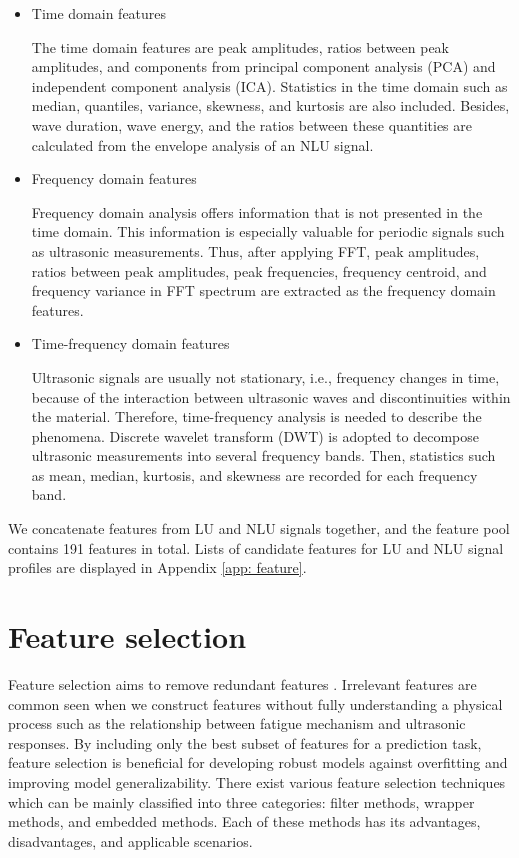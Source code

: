 \begin{itemize}
    \item Time domain features
    
    The time domain features are peak amplitudes, ratios between peak amplitudes, and components from principal component analysis (PCA) and independent component analysis (ICA). Statistics in the time domain such as median, quantiles, variance, skewness, and kurtosis are also included. Besides, wave duration, wave energy, and the ratios between these quantities are calculated from the envelope analysis of an NLU signal.

    \item Frequency domain features
    
    Frequency domain analysis offers information that is not presented in the time domain. This information is especially valuable for periodic signals such as ultrasonic measurements. Thus, after applying FFT, peak amplitudes, ratios between peak amplitudes, peak frequencies, frequency centroid, and frequency variance in FFT spectrum are extracted as the frequency domain features.

    \item Time-frequency domain features
    
    Ultrasonic signals are usually not stationary, i.e., frequency changes in time, because of the interaction between ultrasonic waves and discontinuities within the material. Therefore, time-frequency analysis is needed to describe the phenomena. Discrete wavelet transform (DWT) is adopted to decompose ultrasonic measurements into several frequency bands. Then, statistics such as mean, median, kurtosis, and skewness are recorded for each frequency band.
\end{itemize}

We concatenate features from LU and NLU signals together, and the feature pool contains 191 features in total. Lists of candidate features for LU and NLU signal profiles are displayed in Appendix \ref{app: feature}.

\section{Feature selection}
Feature selection aims to remove redundant features \cite{feature-selection-SHAO2013550}. Irrelevant features are common seen when we construct features without fully understanding a physical process such as the relationship between fatigue mechanism and ultrasonic responses. By including only the best subset of features for a prediction task, feature selection is beneficial for developing robust models against overfitting and improving model generalizability. There exist various feature selection techniques which can be mainly classified into three categories: filter methods, wrapper methods, and embedded methods. Each of these methods has its advantages, disadvantages, and applicable scenarios.

